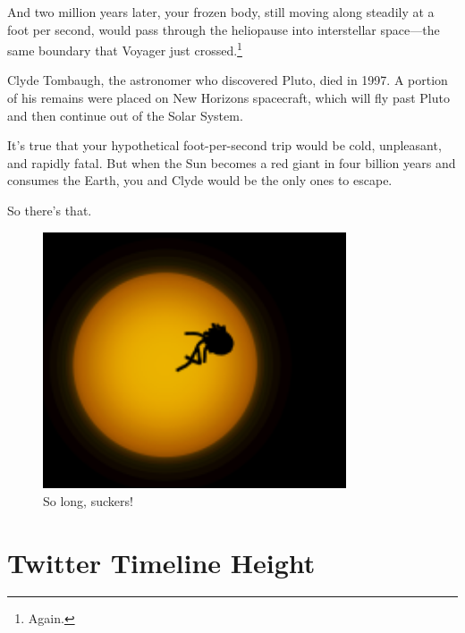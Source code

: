 {{And two million years later, your frozen body, still moving along steadily at a foot per second, would pass through the heliopause into interstellar space—the same boundary that Voyager just crossed.{\footnote{Again.} } }

{Clyde Tombaugh, the astronomer who discovered Pluto, died in 1997. A portion of his remains were placed on New Horizons spacecraft, which will fly past Pluto and then continue out of the Solar System.}

{It's true that your hypothetical foot-per-second trip would be cold, unpleasant, and rapidly fatal. But when the Sun becomes a red giant in four billion years and consumes the Earth, you and Clyde would be the only ones to escape.}

{So there's that.}

\begin{figure}[!htbp]
\centering
\includegraphics[scale=0.5, max width=0.8\textwidth]{imgs/a/64/rising_redgiant.png}
\caption{So long, suckers!}
\end{figure}

{
\chapter{Twitter Timeline Height}
}

\hfill{}

}
